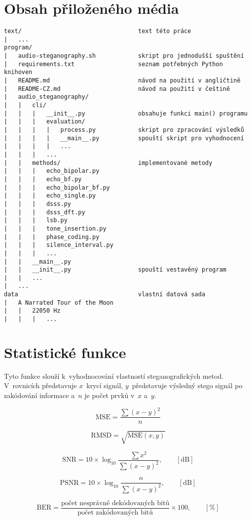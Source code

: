 \chapter{Obsah přiloženého média}
\label{cha:medium-contents}

\begin{verbatim}
text/                                 text této práce
|   ...
program/
|   audio-steganography.sh            skript pro jednodušší spuštění
|   requirements.txt                  seznam potřebných Python knihoven
|   README.md                         návod na použití v angličtině
|   README-CZ.md                      návod na použití v češtině
|   audio_steganography/
|   |   cli/
|   |   |   __init__.py               obsahuje funkci main() programu
|   |   |   evaluation/
|   |   |   |   process.py            skript pro zpracování výsledků
|   |   |   |   __main__.py           spouští skript pro vyhodnocení
|   |   |   |   ...
|   |   |   ...
|   |   methods/                      implementované metody
|   |   |   echo_bipolar.py
|   |   |   echo_bf.py
|   |   |   echo_bipolar_bf.py
|   |   |   echo_single.py
|   |   |   dsss.py
|   |   |   dsss_dft.py
|   |   |   lsb.py
|   |   |   tone_insertion.py
|   |   |   phase_coding.py
|   |   |   silence_interval.py
|   |   |   ...
|   |   __main__.py
|   |   __init__.py                   spouští vestavěný program
|   |   ...
|   ...
data                                  vlastní datová sada
|   A Narrated Tour of the Moon
|   |   22050 Hz
|   |   |   ...
\end{verbatim}


\chapter{Statistické funkce}
\label{cha:statistical-functions}

Tyto funkce slouží k~vyhodnocování vlastností steganografických metod.
V~rovnicích představuje $x$~krycí signál, $y$~představuje výsledný stego
signál po zakódování informace a~$n$ je počet prvků v~$x$ a~$y$.

\begin{equation}
    \textrm{MSE} = \frac{\sum{(x-y)^2}}{n}
\end{equation}

\begin{equation}
    \textrm{RMSD} = \sqrt{\textrm{MSE}(x, y)}
\end{equation}

\begin{equation}
    \textrm{SNR} = 10 \times \log_{10}{\frac{\sum{x^2}}{\sum{(x-y)^2}}}, \qquad [\textrm{dB}]
\end{equation}

\begin{equation}
    \textrm{PSNR} = 10 \times \log_{10}{\frac{n}{\sum{(x-y)^2}}}, \qquad [\textrm{dB}]
\end{equation}

\begin{equation}
    \textrm{BER} = \frac{\textrm{počet nesprávně dekódovaných bitů}}{\textrm{počet zakódovaných bitů}} \times 100, \qquad [\%]
\end{equation}
